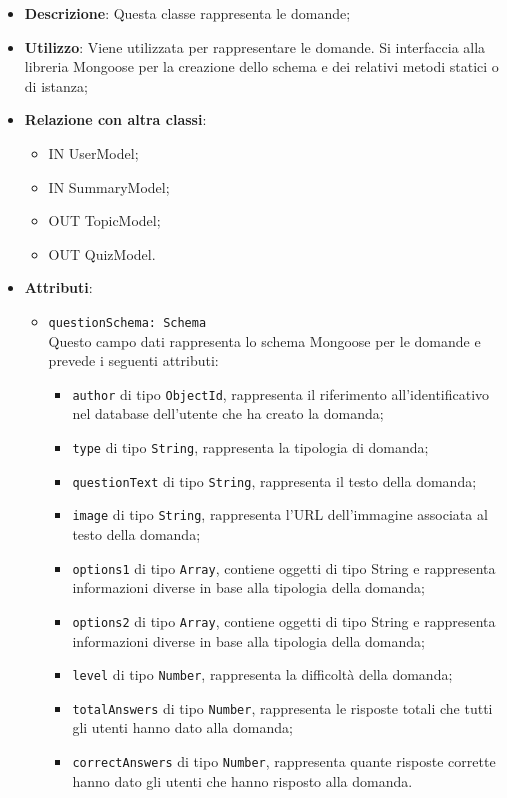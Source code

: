 \begin{itemize}
\item \textbf{Descrizione}: Questa classe rappresenta le domande;	
\item \textbf{Utilizzo}: Viene utilizzata per rappresentare le domande. Si interfaccia alla libreria Mongoose per la creazione dello schema e dei relativi metodi statici o di istanza;
\item \textbf{Relazione con altra classi}:
	\begin{itemize}
	\item IN UserModel;
	\item IN SummaryModel;
	\item OUT TopicModel;
	\item OUT QuizModel.
	\end{itemize}
\item \textbf{Attributi}:
	\begin{itemize}
	\item \texttt{questionSchema: Schema} \\
	Questo campo dati rappresenta lo schema Mongoose per le domande e prevede i 					seguenti attributi:
		\begin{itemize}
		\item \texttt{author} di tipo \texttt{ObjectId}, rappresenta il riferimento 					all'identificativo nel database dell'utente che ha creato la domanda;
		\item \texttt{type} di tipo \texttt{String}, rappresenta la tipologia di domanda;
		\item \texttt{questionText} di tipo \texttt{String}, rappresenta il testo della 				domanda; 
		\item \texttt{image} di tipo \texttt{String}, rappresenta l'URL dell'immagine 				associata al testo della domanda;
		\item \texttt{options1} di tipo \texttt{Array}, contiene oggetti di tipo String e 			rappresenta informazioni diverse in base alla tipologia della	 domanda;
		\item \texttt{options2} di tipo \texttt{Array}, contiene oggetti di tipo String e 			rappresenta informazioni diverse in base alla tipologia della	 domanda;
		\item \texttt{level} di tipo \texttt{Number}, rappresenta la difficoltà della 				domanda;
		\item \texttt{totalAnswers} di tipo \texttt{Number}, rappresenta le risposte 					totali che tutti gli utenti hanno dato alla domanda;
		\item \texttt{correctAnswers} di tipo \texttt{Number}, rappresenta quante risposte 		corrette hanno dato gli utenti che hanno risposto alla domanda.

\end{itemize}
\end{itemize}
\end{itemize}
